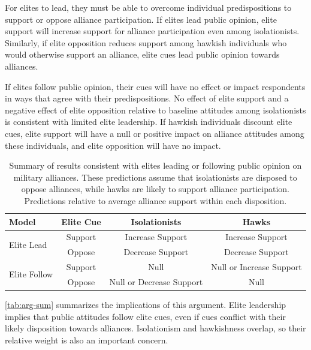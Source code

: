 \documentclass[12pt]{article}
\begin{document}
For elites to lead, they must be able to overcome individual predispositions to support or oppose alliance participation. 
If elites lead public opinion, elite support will increase support for alliance participation even among isolationists. 
Similarly, if elite opposition reduces support among hawkish individuals who would otherwise support an alliance, elite cues lead public opinion towards alliances. 

If elites follow public opinion, their cues will have no effect or impact respondents in ways that agree with their predispositions. 
No effect of elite support and a negative effect of elite opposition relative to baseline attitudes among isolationists is consistent with limited elite leadership. 
If hawkish individuals discount elite cues, elite support will have a null or positive impact on alliance attitudes among these individuals, and elite opposition will have no impact. 


\begin{table}[hbt!]
\begin{center}
\begin{tabular}{lccc}
   Model  & Elite Cue & Isolationists & Hawks  \\
\hline
\multirow{2}{*}{Elite Lead} & Support   & Increase Support  &  Increase Support \\
                            & Oppose    & Decrease Support  &  Decrease Support \\

 \hline
\multirow{2}{*}{Elite Follow} & Support   & Null  & Null or Increase Support \\
                              & Oppose    & Null or Decrease Support   &  Null \\
\hline
\end{tabular}
\caption{Summary of results consistent with elites leading or following public opinion on military alliances. These predictions assume that isolationists are disposed to oppose alliances, while hawks are likely to support alliance participation. Predictions relative to average alliance support within each disposition.}
\label{tab:arg-sum}
\end{center} 
\end{table}


\autoref{tab:arg-sum} summarizes the implications of this argument.  
Elite leadership implies that public attitudes follow elite cues, even if cues conflict with their likely disposition towards alliances. 
Isolationism and hawkishness overlap, so their relative weight is also an important concern.
\end{document}

